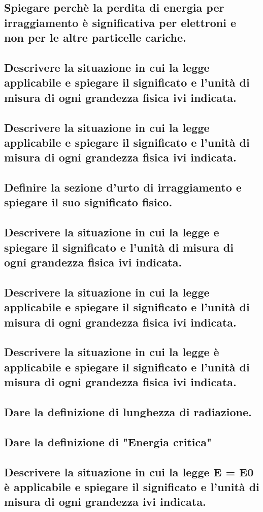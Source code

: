 \subsection{Spiegare perchè la perdita di energia per irraggiamento è significativa per elettroni e non per le altre particelle cariche.
}
\subsection{Descrivere la situazione in cui la legge
applicabile e spiegare il significato e l'unità di misura di ogni grandezza fisica ivi
indicata.
}
\subsection{Descrivere la situazione in cui la legge
applicabile e spiegare il significato e l'unità di misura di ogni grandezza fisica ivi
indicata.
}
\subsection{Definire la sezione d'urto di irraggiamento e spiegare il suo significato fisico.
}
\subsection{Descrivere la situazione in cui la legge
e spiegare il significato e l'unità di misura di ogni grandezza fisica ivi indicata.
}
\subsection{Descrivere la situazione in cui la legge
applicabile e spiegare il significato e l'unità di misura di ogni grandezza fisica ivi
indicata.
}
\subsection{Descrivere la situazione in cui la legge
 è applicabile e spiegare il significato e l'unità di misura di ogni grandezza fisica ivi indicata.
}
\subsection{Dare la definizione di lunghezza di radiazione.
}
\subsection{Dare la definizione di "Energia critica"
}
\subsection{Descrivere la situazione in cui la legge E = E0 
 è applicabile e spiegare il significato e l'unità di misura di ogni grandezza ivi indicata.
}
